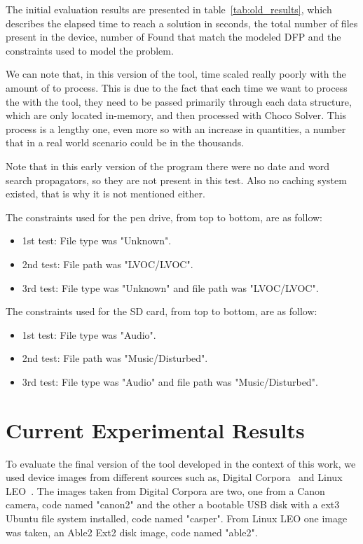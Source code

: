 The initial evaluation results are presented in table~\ref{tab:old_results}, which describes the elapsed time to reach a solution in seconds, the total number of files present in the device, number of \INODES Found that match the modeled \ac{DFP} and the constraints used to model the problem. 

We can note that, in this version of the tool, time scaled really poorly with the amount of \INODES to process. This is due to the fact that each time we want to process the \INODES with the tool, they need to be passed primarily through each data structure, which are only located in-memory, and then processed with Choco Solver. This process is a lengthy one, even more so with an increase in \INODE quantities, a number that in a real world scenario could be in the thousands.

Note that in this early version of the program there were no date and word search propagators, so they are not present in this test. Also no caching system existed, that is why it is not mentioned either.


The constraints used for the pen drive, from top to bottom, are as follow:
\begin{itemize}
    \item 1st test: File type was "Unknown".
    \item 2nd test: File path was "LVOC/LVOC".
    \item 3rd test: File type was "Unknown" and file path was "LVOC/LVOC".
\end{itemize}

The constraints used for the SD card, from top to bottom, are as follow:
\begin{itemize}
    \item 1st test: File type was "Audio".
    \item 2nd test: File path was "Music/Disturbed".
    \item 3rd test: File type was "Audio" and file path was "Music/Disturbed". 
\end{itemize}

\section{Current Experimental Results}

To evaluate the final version of the tool developed in the context of this work, we used device images from different sources such as, Digital Corpora~\cite{DCorpora} and Linux LEO~\cite{LinuxLEO}. The images taken from Digital Corpora are two, one from a Canon camera, code named "canon2" and the other a bootable USB disk with a ext3 Ubuntu file system installed, code named "casper". From Linux LEO one image was taken, an Able2 Ext2 disk image, code named "able2".

